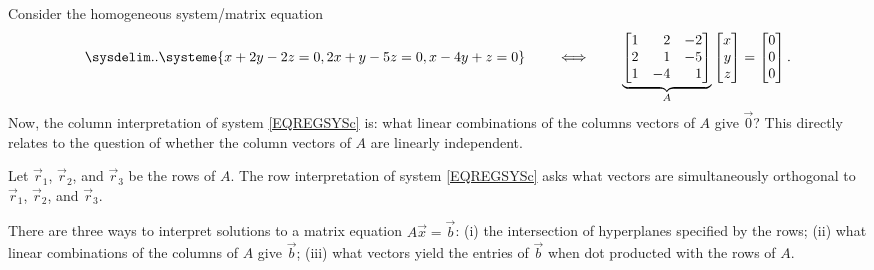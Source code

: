 Consider the homogeneous system/matrix equation
\begin{equation}
	\label{EQREGSYSc}
	\sysdelim..
		\systeme{
			x+2y-2z=0,
			2x+y-5z=0,
			x-4y+z=0
		}
		\qquad\iff\qquad
		\underbrace{\mat{1&2&-2\\2&1&-5\\1&-4&1}}_A\mat{x\\y\\z}=\mat{0\\0\\0}
		.
\end{equation}
Now, the column interpretation of system \eqref{EQREGSYSc} is: what linear combinations of the columns vectors
of $A$ give $\vec 0$? This directly relates to the question of whether the column vectors of $A$ are linearly independent.

Let $\vec r_1$, $\vec r_2$, and $\vec r_3$ be the rows of $A$. The row interpretation of system \eqref{EQREGSYSc} asks
what vectors are simultaneously orthogonal to $\vec r_1$, $\vec r_2$, and $\vec r_3$.

\begin{emphbox}[Takeaway]
	There are three ways to interpret solutions to a matrix equation $A\vec x=\vec b$: (i) the intersection of hyperplanes
	specified by the rows; (ii) what linear combinations of the columns of $A$ give $\vec b$; (iii) what vectors yield
	the entries of $\vec b$ when dot producted with the rows of $A$.
\end{emphbox}

